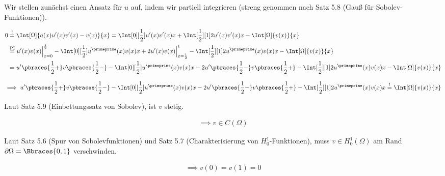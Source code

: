 
\begin{solution}

Wir stellen zunächst einen Ansatz für $u$ auf, indem wir partiell integrieren (streng genommen nach Satz 5.8 (Gauß für Sobolev-Funktionen)).

\begin{align*}
  0
  & \stackrel{!}{=}
  \Int[\Omega]{a(x) u^\prime(x) v^\prime(x) - v(x)}{x}
  =
  \Int[0][\frac{1}{2}]{u^\prime(x) v^\prime(x)}{x}
  +
  \Int[\frac{1}{2}][1]{2 u^\prime(x) v^\prime(x)}{x}
  -
  \Int[\Omega]{v(x)}{x} \\
  & \stackrel
  {
    \mathrm{PI}
  }{=}
  u^\prime(x) v(x) \Big |_{x=0}^{\frac{1}{2}}
  -
  \Int[0][\frac{1}{2}]{u^\primeprime(x) v(x)}{x}
  +
  2 u^\prime(x) v(x) \Big |_{x=\frac{1}{2}}^1
  -
  \Int[\frac{1}{2}][1]{2 u^\primeprime(x) v(x)}{x}
  -
  \Int[\Omega]{v(x)}{x} \\
  & =
  u^\prime \pbraces{\frac{1}{2} +} v\pbraces{\frac{1}{2} -}
  -
  \Int[0][\frac{1}{2}]{u^\primeprime(x) v(x)}{x}
  -
  2 u^\prime \pbraces{\frac{1}{2} -} v\pbraces{\frac{1}{2} +}
  -
  \Int[\frac{1}{2}][1]{2 u^\primeprime(x) v(x)}{x}
  -
  \Int[\Omega]{v(x)}{x}
\end{align*}

\begin{align*}
  \implies
  u^\prime \pbraces{\frac{1}{2} +} v\pbraces{\frac{1}{2} -}
  -
  \Int[0][\frac{1}{2}]{u^\primeprime(x) v(x)}{x}
  -
  2 u^\prime \pbraces{\frac{1}{2} -} v\pbraces{\frac{1}{2} +}
  -
  \Int[\frac{1}{2}][1]{2 u^\primeprime(x) v(x)}{x}
  \stackrel{!}{=}
  \Int[\Omega]{v(x)}{x}
\end{align*}

Laut Satz 5.9 (Einbettungssatz von Sobolev), ist $v$ stetig.

\begin{align*}
  \implies
  v \in C(\Omega)
\end{align*}


Laut Satz 5.6 (Spur von Sobolevfunktionen) und Satz 5.7 (Charakterisierung von $H_0^1$-Funktionen), muss $v \in H_0^1(\Omega)$ am Rand $\partial \Omega = \Bbraces{0, 1}$ verschwinden.

\begin{align*}
  \implies
  v(0) = v(1) = 0
\end{align*}


\end{solution}
